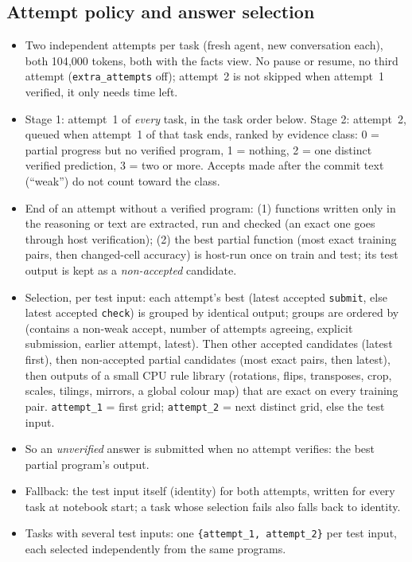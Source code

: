 \subsection{Attempt policy and answer selection}
\begin{itemize}[leftmargin=*,itemsep=1pt]
\item Two independent attempts per task (fresh agent, new conversation each), both 104{,}000 tokens, both with the facts view. No pause or resume, no third attempt (\texttt{extra\_attempts} off); attempt~2 is not skipped when attempt~1 verified, it only needs time left.
\item Stage 1: attempt~1 of \emph{every} task, in the task order below. Stage 2: attempt~2, queued when attempt~1 of that task ends, ranked by evidence class: 0 = partial progress but no verified program, 1 = nothing, 2 = one distinct verified prediction, 3 = two or more. Accepts made after the commit text (``weak'') do not count toward the class.
\item End of an attempt without a verified program: (1) functions written only in the reasoning or text are extracted, run and checked (an exact one goes through host verification); (2) the best partial function (most exact training pairs, then changed-cell accuracy) is host-run once on train and test; its test output is kept as a \emph{non-accepted} candidate.
\item Selection, per test input: each attempt's best (latest accepted \texttt{submit}, else latest accepted \texttt{check}) is grouped by identical output; groups are ordered by (contains a non-weak accept, number of attempts agreeing, explicit submission, earlier attempt, latest). Then other accepted candidates (latest first), then non-accepted partial candidates (most exact pairs, then latest), then outputs of a small CPU rule library (rotations, flips, transposes, crop, scales, tilings, mirrors, a global colour map) that are exact on every training pair. \texttt{attempt\_1} = first grid; \texttt{attempt\_2} = next distinct grid, else the test input.
\item So an \emph{unverified} answer is submitted when no attempt verifies: the best partial program's output.
\item Fallback: the test input itself (identity) for both attempts, written for every task at notebook start; a task whose selection fails also falls back to identity.
\item Tasks with several test inputs: one \texttt{\{attempt\_1, attempt\_2\}} per test input, each selected independently from the same programs.
\end{itemize}

